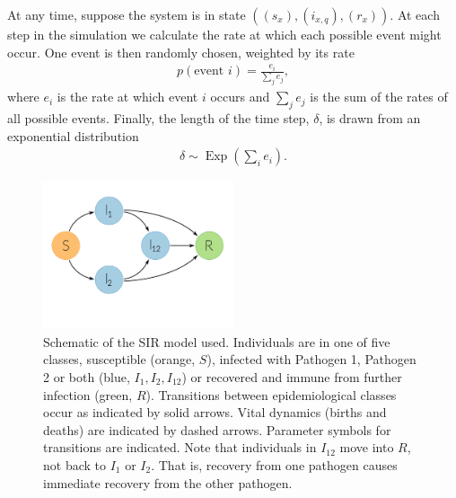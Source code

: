 At any time, suppose the system is in state $((s_x), (i_{x,q}), (r_x))$.
At each step in the simulation we calculate the rate at which each possible event might occur.
One event is then randomly chosen, weighted by its rate
\begin{align}
  p(\text{event } i) = \frac{e_i}{\sum_j e_j},
\end{align}
where $e_i$ is the rate at which event $i$ occurs and $\sum_j e_j$ is the sum of the rates of all possible events.
Finally, the length of the time step, $\delta$, is drawn from an exponential distribution 
\begin{align}
  \delta \sim \operatorname{Exp}\left(\sum_i e_i  \right).
\end{align}


\begin{figure}[t]
\centering
  \includegraphics[width=0.5\textwidth]{imgs/SIRoption1.pdf}
  \caption[Schematic of the SIR model used]{
  Schematic of the SIR model used. 
  Individuals are in one of five classes, susceptible (orange, $S$), infected with Pathogen 1, Pathogen 2 or both (blue, $I_1, I_2, I_{12}$) or recovered and immune from further infection (green, $R$).
  Transitions between epidemiological classes occur as indicated by solid arrows.
  Vital dynamics (births and deaths) are indicated by dashed arrows.
  Parameter symbols for transitions are indicated.
  Note that individuals in $I_{12}$ move into $R$, not back to $I_1$ or $I_2$. 
  That is, recovery from one pathogen causes immediate recovery from the other pathogen.
  }
\label{f:sir}
\end{figure}


